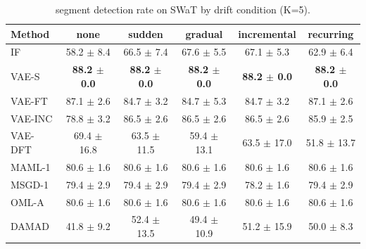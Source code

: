 \begin{table}[t]
\centering
\small
\caption{segment detection rate on SWaT by drift condition (K=5).}
\label{tab:drift_segment_detection_rate_swat}
\begin{tabular}{lccccc}
\toprule
Method & none & sudden & gradual & incremental & recurring \\
\midrule
IF & 58.2 $\pm$ 8.4 & 66.5 $\pm$ 7.4 & 67.6 $\pm$ 5.5 & 67.1 $\pm$ 5.3 & 62.9 $\pm$ 6.4 \\
VAE-S & \textbf{88.2 $\pm$ 0.0} & \textbf{88.2 $\pm$ 0.0} & \textbf{88.2 $\pm$ 0.0} & \textbf{88.2 $\pm$ 0.0} & \textbf{88.2 $\pm$ 0.0} \\
VAE-FT & 87.1 $\pm$ 2.6 & 84.7 $\pm$ 3.2 & 84.7 $\pm$ 5.3 & 84.7 $\pm$ 3.2 & 87.1 $\pm$ 2.6 \\
VAE-INC & 78.8 $\pm$ 3.2 & 86.5 $\pm$ 2.6 & 86.5 $\pm$ 2.6 & 86.5 $\pm$ 2.6 & 85.9 $\pm$ 2.5 \\
VAE-DFT & 69.4 $\pm$ 16.8 & 63.5 $\pm$ 11.5 & 59.4 $\pm$ 13.1 & 63.5 $\pm$ 17.0 & 51.8 $\pm$ 13.7 \\
MAML-1 & 80.6 $\pm$ 1.6 & 80.6 $\pm$ 1.6 & 80.6 $\pm$ 1.6 & 80.6 $\pm$ 1.6 & 80.6 $\pm$ 1.6 \\
MSGD-1 & 79.4 $\pm$ 2.9 & 79.4 $\pm$ 2.9 & 79.4 $\pm$ 2.9 & 78.2 $\pm$ 1.6 & 79.4 $\pm$ 2.9 \\
OML-A & 80.6 $\pm$ 1.6 & 80.6 $\pm$ 1.6 & 80.6 $\pm$ 1.6 & 80.6 $\pm$ 1.6 & 80.6 $\pm$ 1.6 \\
DAMAD & 41.8 $\pm$ 9.2 & 52.4 $\pm$ 13.5 & 49.4 $\pm$ 10.9 & 51.2 $\pm$ 15.9 & 50.0 $\pm$ 8.3 \\
\bottomrule
\end{tabular}
\end{table}

